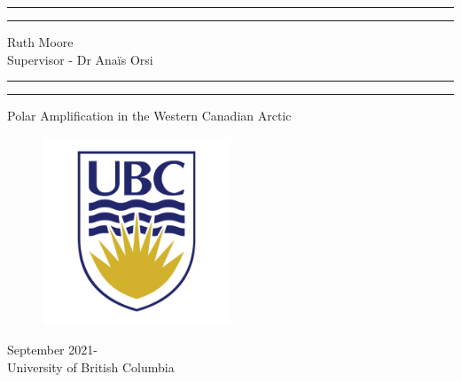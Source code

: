 \documentclass[12pt, oneside]{article}
\begin{document}
\begin{titlepage}
	\centering 
	\scshape
	\vspace*{2\baselineskip}
	\rule{\textwidth}{1.6pt}\vspace*{-\baselineskip}\vspace*{2pt} 
	\rule{\textwidth}{0.4pt} 
	\vspace{0.1in}
		{\Large Ruth Moore } \\
		\vspace{0.1in}
		{\Large Supervisor - Dr Anaïs Orsi} \\
	\vspace{0.75\baselineskip} 
	\rule{\textwidth}{0.4pt}\vspace*{-\baselineskip}\vspace*{2pt} 
		\rule{\textwidth}{1.6pt}
	\vspace*{2\baselineskip} 

\Huge{Polar Amplification in the Western Canadian Arctic}
\vspace{0.1in}	

\begin{figure}[hbtp]
\centering
\includegraphics[width=0.5\textwidth]{figures/ubc-logo-png-transparent.png}
\end{figure}
{\Large September 2021- } \\
	{\large University of British Columbia} 
\end{titlepage}
\pagestyle{fancy}
\tableofcontents
\thispagestyle{empty}
\clearpage
\setcounter{page}{1}


\pagebreak
\begin{abstract}


\end{abstract}
\end{document}
